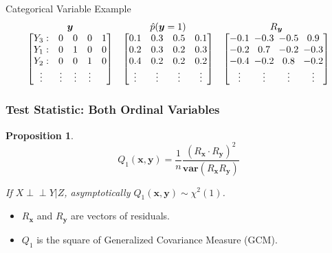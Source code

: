 \documentclass{beamer}
\def\ci{\perp\!\!\!\!\!\perp}
\newtheorem{proposition}{Proposition}
\begin{document}
\begin{frame}
	\begin{block}{Categorical Variable Example}
		\vspace{-1em}
		\begin{equation*}
		\begin{array}{ccc}
			\bm{y} & \hat{p}(\bm{y}=1) & R_{\bm{y}} \\
			\begin{bmatrix}
				Y_3: & 0 & 0 & 0 & 1 \\
				Y_1: & 0 & 1 & 0 & 0 \\
				Y_2: & 0 & 0 & 1 & 0 \\
				\vdots & \vdots & \vdots & \vdots \\
			\end{bmatrix} & 
			\begin{bmatrix}
				0.1 & 0.3 & 0.5 & 0.1 \\
				0.2 & 0.3 & 0.2 & 0.3 \\
				0.4 & 0.2 & 0.2 & 0.2 \\
				\vdots & \vdots & \vdots & \vdots \\
			\end{bmatrix} & 
			\setlength\arraycolsep{2.5pt}
			\begin{bmatrix}
				-0.1 & -0.3 & -0.5 & 0.9 \\
				-0.2 & 0.7 & -0.2& -0.3 \\
				-0.4 & -0.2 & 0.8 & -0.2 \\
				\vdots & \vdots & \vdots & \vdots \\
			\end{bmatrix} \\
		\end{array}
		\end{equation*}	
	\end{block}
\end{frame}

\begin{frame}
	\frametitle{Test Statistic: Both Ordinal Variables}
	\begin{proposition}
	$$ Q_1(\bm{x}, \bm{y}) = \frac{1}{n} \frac{(R_{\bm{x}} \cdot R_{\bm{y}})^2}{\bm{var}(R_{\bm{x}} R_{\bm{y}})} $$
		\begin{center} If $ X \ci Y | Z $, asymptotically $ Q_1(\bm{x}, \bm{y}) \sim \chi^2(1) $. \end{center}
	\end{proposition}
	\begin{center}
		\begin{itemize}
			\item $ R_{\bm{x}} $ and $ R_{\bm{y}} $ are vectors of residuals.
			\item $ Q_1 $ is the square of Generalized Covariance Measure (GCM)\footnotemark.
		\end{itemize}
	\end{center}
\end{frame}
\end{document}

